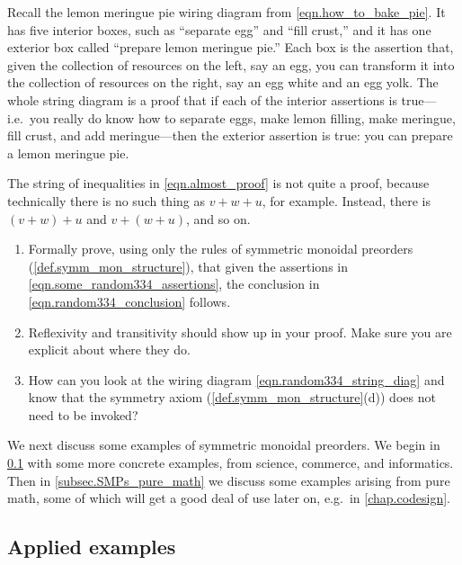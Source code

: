 \documentclass[7Sketches]{subfiles}
\begin{document}
\begin{example}%
Recall the lemon meringue pie wiring diagram from \cref{eqn.how_to_bake_pie}. It has five interior boxes, such as ``separate egg'' and ``fill crust,'' and it has one exterior box called ``prepare lemon meringue pie.'' Each box is the assertion that, given the collection of resources on the left, say an egg, you can transform it into the collection of resources on the right, say an egg white and an egg yolk. The whole string diagram is a proof that if each of the interior assertions is true---i.e.\ you really do know how to separate eggs, make lemon filling, make meringue, fill crust, and add meringue---then the exterior assertion is true: you can prepare a lemon meringue pie. 
\end{example}

\begin{exercise} %
\label{exc.proof_by_wiring}
The string of inequalities in \cref{eqn.almost_proof} is not quite a proof, because technically there is no such thing as $v+w+u$, for example. Instead, there is $(v+w)+u$ and $v+(w+u)$, and so on.
\begin{enumerate}
	\item Formally prove, using only the rules of symmetric monoidal preorders (\cref{def.symm_mon_structure}), that given the assertions in \cref{eqn.some_random334_assertions}, the conclusion in \cref{eqn.random334_conclusion} follows.
	\item Reflexivity and transitivity should show up in your proof. Make sure you are explicit about where they do.
	\item How can you look at the wiring diagram
	\cref{eqn.random334_string_diag} and know that the symmetry axiom
	(\cref{def.symm_mon_structure}(d)) does not need to be invoked?
\qedhere
\end{enumerate}
\end{exercise}

%

We next discuss some examples of symmetric monoidal preorders. We begin in
\cref{subsec.SMPs_science} with some more concrete examples, from science, commerce, and informatics. Then in \cref{subsec.SMPs_pure_math} we discuss some examples arising from pure math, some of which will get a good deal of use later on, e.g.\ in \cref{chap.codesign}.

\subsection{Applied examples}%
\label{subsec.SMPs_science}
\end{document}
